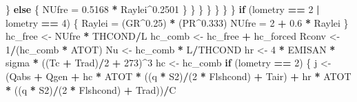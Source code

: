 \documentclass[]{article}
\newenvironment{Shaded}{\begin{snugshade}}{\end{snugshade}}
\newcommand{\DecValTok}[1]{\textcolor[rgb]{0.00,0.00,0.81}{#1}}
\newcommand{\FloatTok}[1]{\textcolor[rgb]{0.00,0.00,0.81}{#1}}
\newcommand{\StringTok}[1]{\textcolor[rgb]{0.31,0.60,0.02}{#1}}
\newcommand{\ControlFlowTok}[1]{\textcolor[rgb]{0.13,0.29,0.53}{\textbf{#1}}}
\newcommand{\OperatorTok}[1]{\textcolor[rgb]{0.81,0.36,0.00}{\textbf{#1}}}
\newcommand{\NormalTok}[1]{#1}
\begin{document}
\begin{Shaded}
\begin{Highlighting}[]
\NormalTok{                      \}}
                      \ControlFlowTok{else}\NormalTok{ \{}
\NormalTok{                        NUfre =}\StringTok{ }\FloatTok{0.5168} \OperatorTok{*}\StringTok{ }\NormalTok{Raylei}\OperatorTok{^}\FloatTok{0.2501}
\NormalTok{                      \}}
\NormalTok{                    \}}
\NormalTok{                  \}}
\NormalTok{                \}}
\NormalTok{            \}}
\NormalTok{        \}}
\NormalTok{    \}}
    \ControlFlowTok{if}\NormalTok{ (lometry }\OperatorTok{==}\StringTok{ }\DecValTok{2} \OperatorTok{|}\StringTok{ }\NormalTok{lometry }\OperatorTok{==}\StringTok{ }\DecValTok{4}\NormalTok{) \{}
\NormalTok{        Raylei =}\StringTok{ }\NormalTok{(GR}\OperatorTok{^}\FloatTok{0.25}\NormalTok{) }\OperatorTok{*}\StringTok{ }\NormalTok{(PR}\OperatorTok{^}\FloatTok{0.333}\NormalTok{)}
\NormalTok{        NUfre =}\StringTok{ }\DecValTok{2} \OperatorTok{+}\StringTok{ }\FloatTok{0.6} \OperatorTok{*}\StringTok{ }\NormalTok{Raylei}
\NormalTok{    \}}
\NormalTok{    hc_free <-}\StringTok{ }\NormalTok{NUfre }\OperatorTok{*}\StringTok{ }\NormalTok{THCOND}\OperatorTok{/}\NormalTok{L}
\NormalTok{    hc_comb <-}\StringTok{ }\NormalTok{hc_free }\OperatorTok{+}\StringTok{ }\NormalTok{hc_forced}
\NormalTok{    Rconv <-}\StringTok{ }\DecValTok{1}\OperatorTok{/}\NormalTok{(hc_comb }\OperatorTok{*}\StringTok{ }\NormalTok{ATOT)}
\NormalTok{    Nu <-}\StringTok{ }\NormalTok{hc_comb }\OperatorTok{*}\StringTok{ }\NormalTok{L}\OperatorTok{/}\NormalTok{THCOND}
\NormalTok{    hr <-}\StringTok{ }\DecValTok{4} \OperatorTok{*}\StringTok{ }\NormalTok{EMISAN }\OperatorTok{*}\StringTok{ }\NormalTok{sigma }\OperatorTok{*}\StringTok{ }\NormalTok{((Tc }\OperatorTok{+}\StringTok{ }\NormalTok{Trad)}\OperatorTok{/}\DecValTok{2} \OperatorTok{+}\StringTok{ }\DecValTok{273}\NormalTok{)}\OperatorTok{^}\DecValTok{3}
\NormalTok{    hc <-}\StringTok{ }\NormalTok{hc_comb}
    \ControlFlowTok{if}\NormalTok{ (lometry }\OperatorTok{==}\StringTok{ }\DecValTok{2}\NormalTok{) \{}
\NormalTok{        j <-}\StringTok{ }\NormalTok{(Qabs }\OperatorTok{+}\StringTok{ }\NormalTok{Qgen }\OperatorTok{+}\StringTok{ }\NormalTok{hc }\OperatorTok{*}\StringTok{ }\NormalTok{ATOT }\OperatorTok{*}\StringTok{ }\NormalTok{((q }\OperatorTok{*}\StringTok{ }\NormalTok{S2)}\OperatorTok{/}\NormalTok{(}\DecValTok{2} \OperatorTok{*}\StringTok{ }\NormalTok{Flshcond) }\OperatorTok{+}\StringTok{ }
\StringTok{            }\NormalTok{Tair) }\OperatorTok{+}\StringTok{ }\NormalTok{hr }\OperatorTok{*}\StringTok{ }\NormalTok{ATOT }\OperatorTok{*}\StringTok{ }\NormalTok{((q }\OperatorTok{*}\StringTok{ }\NormalTok{S2)}\OperatorTok{/}\NormalTok{(}\DecValTok{2} \OperatorTok{*}\StringTok{ }\NormalTok{Flshcond) }\OperatorTok{+}\StringTok{ }\NormalTok{Trad))}\OperatorTok{/}\NormalTok{C}

\end{Highlighting}
\end{Shaded}
\end{document}
